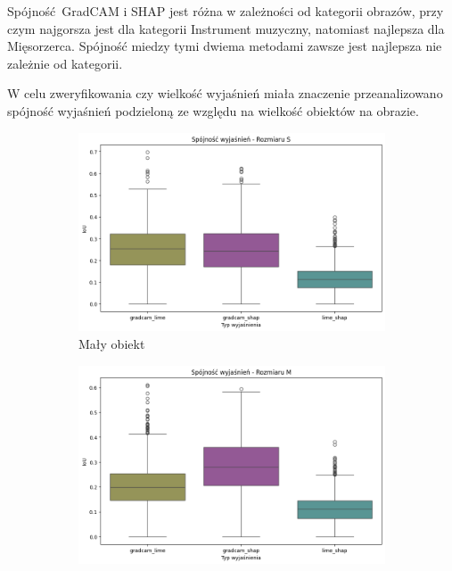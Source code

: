 Spójność GradCAM i SHAP jest różna w zależności od kategorii obrazów, przy czym najgorsza jest dla kategorii Instrument muzyczny, natomiast najlepsza dla Mięsorzerca.
Spójność miedzy tymi dwiema metodami zawsze jest najlepsza nie zależnie od kategorii.

\vspace{1cm}
W celu zweryfikowania czy wielkość wyjaśnień miała znaczenie przeanalizowano spójność wyjaśnień podzieloną ze względu na wielkość obiektów na obrazie.

\begin{figure}[h]
	\centering
	\begin{subfigure}[b]{0.3\textwidth}
		\includegraphics[width=1\textwidth]{img/base_coherence_size_S}
		\caption{Mały obiekt}  \label{}
	\end{subfigure}
	\begin{subfigure}[b]{0.3\textwidth}
		\centering\includegraphics[width=1\textwidth]{img/base_coherence_size_M}

\end{subfigure}
\end{figure}
